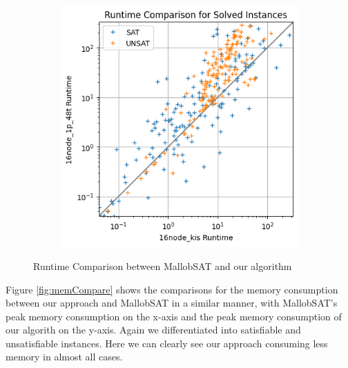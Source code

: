 \documentclass[12pt,a4paper,twoside]{scrartcl}
\numberwithin{equation}{section}
\begin{document}
\begin{figure}
\begin{subfigure}[c]{.4\textwidth}
    \label{fig:runtimeCompare4node}
  \end{subfigure}
  \begin{subfigure}[c]{.4\textwidth}
    \center
    \includegraphics[scale=.5]{plots/square_runtime_compare/square_runtime_16node.png}
    \label{fig:runtimeCompare16node}
  \end{subfigure}
  \caption{Runtime Comparison between MallobSAT and our algorithm}
  \label{fig:runtimeCompare}
\end{figure}

Figure \ref{fig:memCompare} shows the comparisons for the memory consumption between our approach and MallobSAT in a similar manner, with MallobSAT's peak memory consumption on the x-axis and the peak memory consumption of our algorith on the y-axis. Again we differentiated into satisfiable and unsatisfiable instances. Here we can clearly see our approach consuming less memory in almost all cases.
\end{document}
